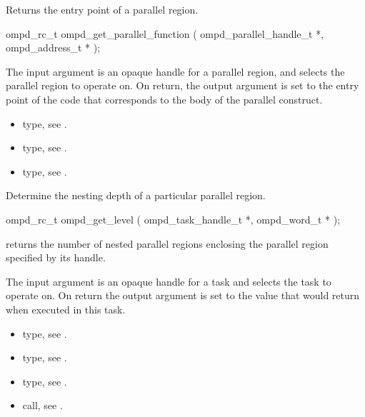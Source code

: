 \label{subsubsubsec:ompd_get_parallel_function}
\summary
Returns the entry point of a parallel region.

\format
\begin{cspecific}
\begin{ompSyntax}
ompd_rc_t ompd_get_parallel_function (
  ompd_parallel_handle_t *,
  ompd_address_t *
);
\end{ompSyntax}
\end{cspecific}

\descr

\argdesc
The input argument  is an opaque handle for a
parallel region, and selects the parallel region to operate on.
On return,  the output argument  is set to the
entry point of the code that corresponds to the body of the parallel
construct.

\crossreferences
\begin{itemize}
  \item {} type, see .
	\item {} type, see .
	\item {} type, see .
\end{itemize}


\label{subsubsubsec:ompd_get_level}
\summary
Determine the nesting depth of a particular parallel region.

\format
\begin{cspecific}
\begin{ompSyntax}
ompd_rc_t ompd_get_level (
  ompd_task_handle_t *,
  ompd_word_t *
);
\end{ompSyntax}
\end{cspecific}

\descr
{} returns the number of nested
parallel regions enclosing the parallel region specified by its handle.

\argdesc
The input argument  is an opaque handle for a task and selects the task to operate on.
On return the output argument  is set to the value that  would return
when executed in this task.


\crossreferences
\begin{itemize}
  \item {} type, see .
	\item {} type, see .
	\item {} type, see .
	\item {} call, see .
\end{itemize}


